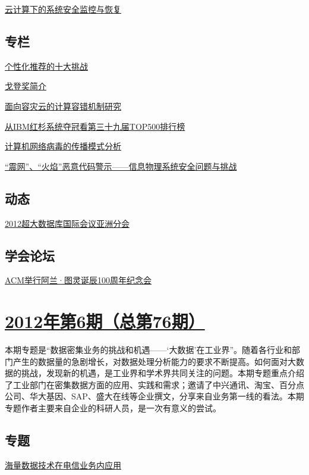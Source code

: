 \documentclass[a4paper]{article}
\begin{document}
\href{http://history.ccf.org.cn/resources/1190201776262/2012/07/16/2.pdf}{云计算下的系统安全监控与恢复}

\subsection{专栏}
\href{http://history.ccf.org.cn/resources/1190201776262/2012/07/16/8.pdf}{个性化推荐的十大挑战}

\href{http://history.ccf.org.cn/resources/1190201776262/2012/07/16/11.pdf}{戈登奖简介}

\href{http://history.ccf.org.cn/resources/1190201776262/2012/07/16/9.pdf}{面向容灾云的计算容错机制研究}

\href{http://history.ccf.org.cn/resources/1190201776262/2012/07/16/10.pdf}{从IBM红杉系统夺冠看第三十九届TOP500排行榜}

\href{http://history.ccf.org.cn/resources/1190201776262/2012/07/16/12.pdf}{计算机网络病毒的传播模式分析}

\href{http://history.ccf.org.cn/resources/1190201776262/2012/07/16/13.pdf}{“震网”、“火焰”恶意代码警示——信息物理系统安全问题与挑战}

\subsection{动态}
\href{http://history.ccf.org.cn/resources/1190201776262/2012/07/16/14.pdf}{2012超大数据库国际会议亚洲分会}

\subsection{学会论坛}
\href{http://history.ccf.org.cn/resources/1190201776262/2012/07/16/16.pdf}{ACM举行阿兰·图灵诞辰100周年纪念会}


\section{\href{http://history.ccf.org.cn/sites/ccf/jsjtbbd.jsp?contentId=2679929345796}{\textbf{2012年第6期（总第76期）}}}
本期专题是“数据密集业务的挑战和机遇——‘大数据’在工业界”。随着各行业和部门产生的数据量的急剧增长，对数据处理分析能力的要求不断提高。如何面对大数据的挑战，发现新的机遇，是工业界和学术界共同关注的问题。本期专题重点介绍了工业部门在密集数据方面的应用、实践和需求；邀请了中兴通讯、淘宝、百分点公司、华大基因、SAP、盛大在线等企业撰文，分享来自业务第一线的看法。本期专题作者主要来自企业的科研人员，是一次有意义的尝试。
\subsection{专题}
\href{http://history.ccf.org.cn/resources/1190201776262/2012/06/18/2.pdf}{海量数据技术在电信业务内应用}
\end{document}

